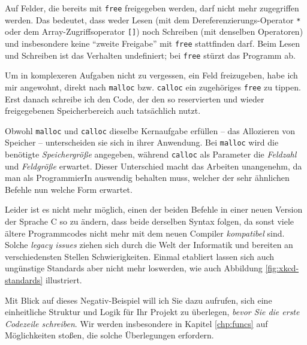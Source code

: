 \begin{warnbox}
Auf Felder, die bereits mit \texttt{free} freigegeben werden, darf nicht mehr zugegriffen werden. Das bedeutet, dass weder Lesen (mit dem Dereferenzierungs-Operator \texttt{*} oder dem Array-Zugriffsoperator \texttt{[]}) noch Schreiben (mit denselben Operatoren) und insbesondere keine \enquote{zweite Freigabe} mit \texttt{free} stattfinden darf. Beim Lesen und Schreiben ist das Verhalten undefiniert; bei \texttt{free} stürzt das Programm ab.
\end{warnbox}

\begin{hintbox}
Um in komplexeren Aufgaben nicht zu vergessen, ein Feld freizugeben, habe ich mir angewohnt, direkt nach \texttt{malloc} bzw. \texttt{calloc} ein zugehöriges \texttt{free} zu tippen. Erst danach schreibe ich den Code, der den so reservierten und wieder freigegebenen Speicherbereich auch tatsächlich nutzt.
\end{hintbox}

\begin{hintbox}
Obwohl \texttt{malloc} und \texttt{calloc} dieselbe Kernaufgabe erfüllen -- das Allozieren von Speicher -- unterscheiden sie sich in ihrer Anwendung. Bei \texttt{malloc} wird die benötigte \emph{Speichergröße} angegeben, während \texttt{calloc} als Parameter die \emph{Feldzahl} und \emph{Feldgröße} erwartet. Dieser Unterschied macht das Arbeiten unangenehm, da man als ProgrammierIn auswendig behalten muss, welcher der sehr ähnlichen Befehle nun welche Form erwartet.

Leider ist es nicht mehr möglich, einen der beiden Befehle in einer neuen Version der Sprache C so zu ändern, dass beide derselben Syntax folgen, da sonst viele ältere Programmcodes nicht mehr mit dem neuen Compiler \emph{kompatibel} sind. Solche \emph{legacy issues} ziehen sich durch die Welt der Informatik und bereiten an verschiedensten Stellen Schwierigkeiten. Einmal etabliert lassen sich auch ungünstige Standards aber nicht mehr loswerden, wie auch Abbildung \ref{fig:xkcd-standards} illustriert.

Mit Blick auf dieses Negativ-Beispiel will ich Sie dazu aufrufen, sich eine einheitliche Struktur und Logik für Ihr Projekt zu überlegen, \emph{bevor Sie die erste Codezeile schreiben}. Wir werden insbesondere in Kapitel \ref{chp:funcs} auf Möglichkeiten stoßen, die solche Überlegungen erfordern.
\end{hintbox}

